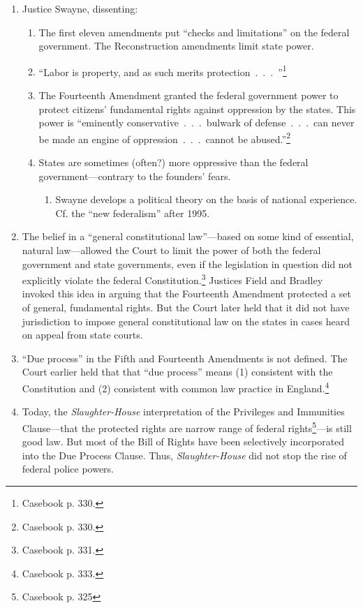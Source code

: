 \begin{enumerate}
\begin{enumerate}
        expressed.''\footnote{Casebook p. 329.}
    \end{enumerate}
    \item Justice Swayne, dissenting:
    \begin{enumerate}
        \item The first eleven amendments put ``checks and limitations'' on 
        the federal government. The Reconstruction amendments limit state 
        power.
        \item ``Labor is property, and as such merits 
        protection~.~.~.~''\footnote{Casebook p. 330.}
        \item The Fourteenth Amendment granted the federal government power to 
        protect citizens' fundamental rights against oppression by the states. 
        This power is ``eminently conservative~.~.~.~bulwark of 
        defense~.~.~.~can never be made an engine of oppression~.~.~.~cannot 
        be abused.''\footnote{Casebook p. 330.}
        \item States are sometimes (often?) more oppressive than the federal 
        government---contrary to the founders' fears.
        \begin{enumerate}
            \item Swayne develops a political theory on the basis of national 
            experience. Cf. the ``new federalism'' after 1995.
        \end{enumerate}
    \end{enumerate}
    \item The belief in a ``general constitutional law''---based on some kind 
    of essential, natural law---allowed the Court to limit the power of both 
    the federal government and state governments, even if the legislation in 
    question did not explicitly violate the federal 
    Constitution.\footnote{Casebook p.  331.} Justices Field and Bradley 
    invoked this idea in arguing that the Fourteenth Amendment protected a set 
    of general, fundamental rights. But the Court later held that it did not 
    have jurisdiction to impose general constitutional law on the states in 
    cases heard on appeal from state courts.
    \item ``Due process'' in the Fifth and Fourteenth Amendments is not 
    defined. The Court earlier held that that ``due process'' means (1) 
    consistent with the Constitution and (2) consistent with common law 
    practice in England.\footnote{Casebook p. 333.}
    \item Today, the \emph{Slaughter-House} interpretation of the Privileges 
    and Immunities Clause---that the protected rights are narrow range of 
    federal rights\footnote{Casebook p. 325}---is still good law. But most of 
    the Bill of Rights have been selectively incorporated into the Due Process 
    Clause. Thus, \emph{Slaughter-House} did not stop the rise of federal 
    police powers.
\end{enumerate}

